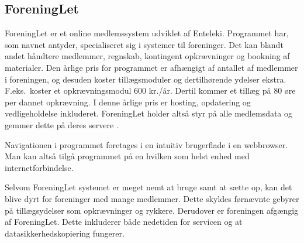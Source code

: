 



\subsection{ForeningLet} %
\label{sub:ForeningLet}

ForeningLet er et online medlemssystem udviklet af Enteleki. Programmet har, som navnet antyder, specialiseret sig i systemer til foreninger. Det kan blandt andet håndtere medlemmer, regnskab, kontingent opkrævninger og bookning af materialer. Den årlige pris for programmet er afhængigt af antallet af medlemmer i foreningen, og desuden koster tillægsmoduler og dertilhørende ydelser ekstra. F.eks.\ koster et opkrævningsmodul 600 kr./år. Dertil kommer et tillæg på 80 øre per dannet opkrævning. I denne årlige pris er hosting, opdatering og vedligeholdelse inkluderet. ForeningLet holder altså styr på alle medlemsdata og gemmer dette på deres servere \cite{foreninglet}.

Navigationen i programmet foretages i en intuitiv brugerflade i en webbrowser. Man kan altså tilgå programmet på en hvilken som helst enhed med internetforbindelse. 


Selvom ForeningLet systemet er meget nemt at bruge samt at sætte op, kan det blive dyrt for foreninger med mange medlemmer. Dette skyldes førnævnte gebyrer på tillægsydelser som opkrævninger og rykkere. Derudover er foreningen afgængig af ForeningLet. Dette inkluderer både nedetiden for servicen og at datasikkerhedskopiering fungerer.

